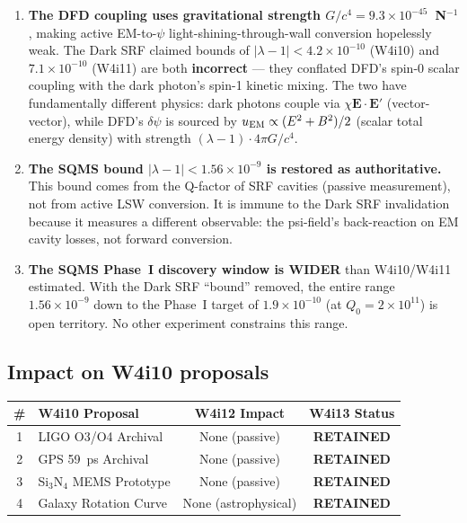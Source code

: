 \documentclass[11pt]{article}
\newcommand{\ee}[1]{\times 10^{#1}}
\newcommand{\lbone}{|\lambda - 1|}
\newcommand{\dpsi}{\delta\psi}
\begin{document}
\begin{enumerate}
\item \textbf{The DFD coupling uses gravitational strength $G/c^4 =
9.3\ee{-45}$~N$^{-1}$}, making active EM-to-$\psi$ light-shining-through-wall
conversion hopelessly weak. The Dark SRF claimed bounds of $\lbone <
4.2\ee{-10}$ (W4i10) and $7.1\ee{-10}$ (W4i11) are both \textbf{incorrect}
--- they conflated DFD's spin-0 scalar coupling with the dark photon's
spin-1 kinetic mixing. The two have fundamentally different physics:
dark photons couple via $\chi \mathbf{E}\cdot\mathbf{E}'$ (vector-vector),
while DFD's $\dpsi$ is sourced by $u_{\rm EM} \propto (E^2 + B^2)/2$
(scalar total energy density) with strength $(\lambda-1) \cdot 4\pi G/c^4$.

\item \textbf{The SQMS bound $\lbone < 1.56\ee{-9}$ is restored as
authoritative.} This bound comes from the Q-factor of SRF cavities
(passive measurement), not from active LSW conversion. It is immune
to the Dark SRF invalidation because it measures a different observable:
the psi-field's back-reaction on EM cavity losses, not forward conversion.

\item \textbf{The SQMS Phase~I discovery window is WIDER} than W4i10/W4i11
estimated. With the Dark SRF ``bound'' removed, the entire range
$1.56\ee{-9}$ down to the Phase~I target of $1.9\ee{-10}$ (at $Q_0 = 2\ee{11}$)
is open territory. No other experiment constrains this range.
\end{enumerate}

\subsection{Impact on W4i10 proposals}

\begin{center}
\renewcommand{\arraystretch}{1.3}
\begin{tabular}{@{}clcc@{}}
\toprule
\textbf{\#} & \textbf{W4i10 Proposal} & \textbf{W4i12 Impact} & \textbf{W4i13 Status} \\
\midrule
1 & LIGO O3/O4 Archival & None (passive) & \textbf{RETAINED} \\
2 & GPS 59~ps Archival & None (passive) & \textbf{RETAINED} \\
3 & Si$_3$N$_4$ MEMS Prototype & None (passive) & \textbf{RETAINED} \\
4 & Galaxy Rotation Curve & None (astrophysical) & \textbf{RETAINED} \\
\bottomrule
\end{tabular}
\end{center}
\end{document}
